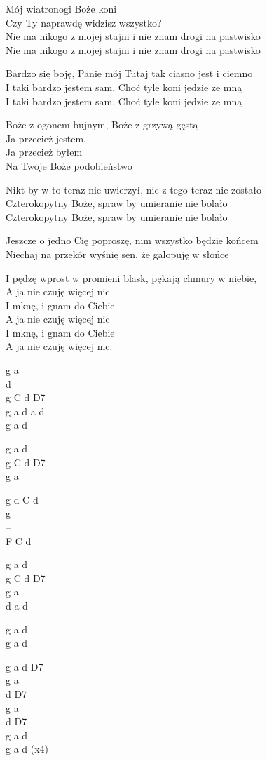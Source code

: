 \begin{text}

Mój wiatronogi Boże koni\\
Czy Ty naprawdę widzisz wszystko?\\
Nie ma nikogo z mojej stajni i nie znam drogi na pastwisko\\
Nie ma nikogo z mojej stajni i nie znam drogi na pastwisko

\hfill\break
Bardzo się boję, Panie mój Tutaj tak ciasno jest i ciemno\\
I taki bardzo jestem sam, Choć tyle koni jedzie ze mną\\
I taki bardzo jestem sam, Choć tyle koni jedzie ze mną

Boże z ogonem bujnym, Boże z grzywą gęstą\\
Ja przecież jestem.\\
Ja przecież byłem\\
Na Twoje Boże podobieństwo

Nikt by w to teraz nie uwierzył, nic z tego teraz nie zostało\\
Czterokopytny Boże, spraw by umieranie nie bolało\\
Czterokopytny Boże, spraw by umieranie nie bolało

\hfill\break
Jeszcze o jedno Cię poproszę, nim wszystko będzie końcem\\
Niechaj na przekór wyśnię sen, że galopuję w słońce

I pędzę wprost w promieni blask, pękają chmury w niebie,\\
A ja nie czuję więcej nic\\
I mknę, i gnam do Ciebie\\
A ja nie czuję więcej nic\\
I mknę, i gnam do Ciebie\\
A ja nie czuję więcej nic.

\end{text}
\begin{chord}
\small{
g a\\
d\\
g C d D7\\
g a d a d\\
g a d

g a d\\
g C d D7\\
g a

g d C d\\
g\\
--\\
F C d

g a d\\
g C d D7\\
g a\\
d a d

g a d\\
g a d

g a d D7\\
g a\\
d D7\\
g a\\
d D7\\
g a d\\
g a d (x4)
}
\end{chord}
